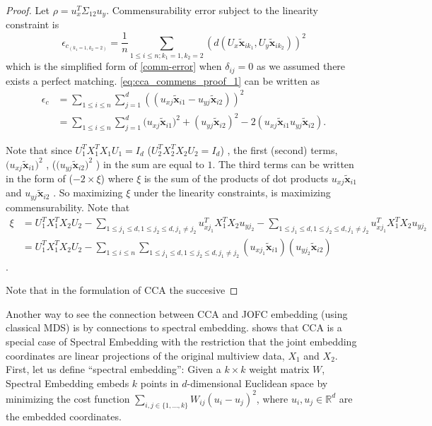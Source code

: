 \documentclass[12pt,oneside,final]{thesis}\usepackage[]{graphicx}\usepackage[]{color}
\begin{document}
\begin{proof}
Let $\rho=u_x^T \Sigma_{12} u_y$. Commensurability error subject to the linearity constraint is  \[
\epsilon_{c_{(k_1=1,k_2=2)}} = \frac{1}{n} \sum_{1 \leq i \leq n;k_1=1,k_2=2} (d(U_x\widetilde{\bm{x}}_{ik_1},U_y \widetilde{\bm{x}}_{ik_2}))^2
\label{eq:cca_commens_proof_1}\]
which is the simplified form of \ref{comm-error} when $\delta_{ij}=0$ as we assumed there exists a perfect matching. \ref{eq:cca_commens_proof_1} can be written as
\begin{align*}
\epsilon_c &= \sum_{1 \leq i \leq n} \sum_{j=1}^d ((u_{xj}\widetilde{\bm{x}}_{i1}-u_{yj} \widetilde{\bm{x}}_{i2}))^2 \\
&= \sum_{1 \leq i \leq n} \sum_{j=1}^d {(u_{xj}\widetilde{\bm{x}}_{i1}})^2+ ( u_{yj} \widetilde{\bm{x}}_{i2})^2 - 2 (u_{xj} \widetilde{\bm{x}}_{i1} u_{yj} \widetilde{\bm{x}}_{i2}).
\end{align*}

Note that since $U_1^{T}X_1^{T}X_1U_1=I_d$ ($U_2^{T}X_2^{T}X_2U_2=I_d$) , the first (second) terms, ${(u_{xj}\widetilde{\bm{x}}_{i1}})^2  $ , 
(${(u_{yj}\widetilde{\bm{x}}_{i2}})^2 $ )
in the sum are equal to  $1$. The third terms can be written in the form of  ($ -2 \times \xi$) where $\xi$ is the sum of the products of dot products  $u_{xj} \widetilde{\bm{x}}_{i1}$ and  $u_{yj} \widetilde{\bm{x}}_{i2}$  . So maximizing $\xi$ under the linearity constraints,  is maximizing  commensurability.
Note that 
\begin{align*}
\xi &= U_1^{T}X_1^{T}X_2U_2 - \sum_{1 \leq j_1 \leq d, 1 \leq j_2 \leq d, j_1 \neq j_2} u_{xj_1}^T X_1^{T}X_2u_{yj_2}  -   \sum_{1 \leq j_1 \leq d, 1 \leq j_2 \leq d, j_1 \neq j_2} u_{xj_1}^T X_1^{T}X_2u_{yj_2}  \\
&=  U_1^{T}X_1^{T}X_2U_2 -\sum_{1 \leq i \leq n} \sum_{1 \leq j_1 \leq d, 1 \leq j_2 \leq d, j_1 \neq j_2} {(u_{xj_1} \widetilde{\bm{x}}_{i1}) (u_{yj_2} \widetilde{\bm{x}}_{i2})}
\end{align*}
.

Note that in the formulation of CCA the succesive



\end{proof}




Another way to see the connection between CCA and JOFC embedding (using classical MDS) is by connections to spectral embedding. \cite{CCAviaSpectralEmbed} shows that CCA is a special case of Spectral Embedding with the restriction that the joint embedding coordinates are linear projections of the original multiview data, $X_1$ and $X_2$. First, let us define ``spectral embedding'':
Given  a $k \times k$ weight matrix $W$, Spectral Embedding embeds $k$ points in $d$-dimensional Euclidean space by  minimizing the cost function $\sum_{i,j \in \{1,\ldots,k\}}W_{ij}\left(u_i-u_j\right)^2$, where $u_i, u_j \in \mathbb{R}^d$ are the embedded coordinates.
\end{document}
